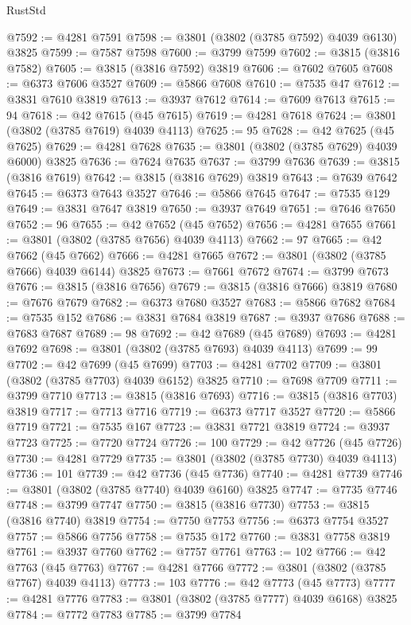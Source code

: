 \begin{lexlean}{RustStd}
\begin{coremodule}
@7592 := @4281 @7591
@7598 := @3801 (@3802 (@3785 @7592) @4039 @6130) @3825
@7599 := @7587 @7598
@7600 := @3799 @7599
@7602 := @3815 (@3816 @7582)
@7605 := @3815 (@3816 @7592) @3819
@7606 := @7602 @7605
@7608 := @6373 @7606 @3527
@7609 := @5866 @7608
@7610 := @7535 @47
@7612 := @3831 @7610 @3819
@7613 := @3937 @7612
@7614 := @7609 @7613
@7615 := 94
@7618 := @42 @7615 (@45 @7615)
@7619 := @4281 @7618
@7624 := @3801 (@3802 (@3785 @7619) @4039 @4113)
@7625 := 95
@7628 := @42 @7625 (@45 @7625)
@7629 := @4281 @7628
@7635 := @3801 (@3802 (@3785 @7629) @4039 @6000) @3825
@7636 := @7624 @7635
@7637 := @3799 @7636
@7639 := @3815 (@3816 @7619)
@7642 := @3815 (@3816 @7629) @3819
@7643 := @7639 @7642
@7645 := @6373 @7643 @3527
@7646 := @5866 @7645
@7647 := @7535 @129
@7649 := @3831 @7647 @3819
@7650 := @3937 @7649
@7651 := @7646 @7650
@7652 := 96
@7655 := @42 @7652 (@45 @7652)
@7656 := @4281 @7655
@7661 := @3801 (@3802 (@3785 @7656) @4039 @4113)
@7662 := 97
@7665 := @42 @7662 (@45 @7662)
@7666 := @4281 @7665
@7672 := @3801 (@3802 (@3785 @7666) @4039 @6144) @3825
@7673 := @7661 @7672
@7674 := @3799 @7673
@7676 := @3815 (@3816 @7656)
@7679 := @3815 (@3816 @7666) @3819
@7680 := @7676 @7679
@7682 := @6373 @7680 @3527
@7683 := @5866 @7682
@7684 := @7535 @152
@7686 := @3831 @7684 @3819
@7687 := @3937 @7686
@7688 := @7683 @7687
@7689 := 98
@7692 := @42 @7689 (@45 @7689)
@7693 := @4281 @7692
@7698 := @3801 (@3802 (@3785 @7693) @4039 @4113)
@7699 := 99
@7702 := @42 @7699 (@45 @7699)
@7703 := @4281 @7702
@7709 := @3801 (@3802 (@3785 @7703) @4039 @6152) @3825
@7710 := @7698 @7709
@7711 := @3799 @7710
@7713 := @3815 (@3816 @7693)
@7716 := @3815 (@3816 @7703) @3819
@7717 := @7713 @7716
@7719 := @6373 @7717 @3527
@7720 := @5866 @7719
@7721 := @7535 @167
@7723 := @3831 @7721 @3819
@7724 := @3937 @7723
@7725 := @7720 @7724
@7726 := 100
@7729 := @42 @7726 (@45 @7726)
@7730 := @4281 @7729
@7735 := @3801 (@3802 (@3785 @7730) @4039 @4113)
@7736 := 101
@7739 := @42 @7736 (@45 @7736)
@7740 := @4281 @7739
@7746 := @3801 (@3802 (@3785 @7740) @4039 @6160) @3825
@7747 := @7735 @7746
@7748 := @3799 @7747
@7750 := @3815 (@3816 @7730)
@7753 := @3815 (@3816 @7740) @3819
@7754 := @7750 @7753
@7756 := @6373 @7754 @3527
@7757 := @5866 @7756
@7758 := @7535 @172
@7760 := @3831 @7758 @3819
@7761 := @3937 @7760
@7762 := @7757 @7761
@7763 := 102
@7766 := @42 @7763 (@45 @7763)
@7767 := @4281 @7766
@7772 := @3801 (@3802 (@3785 @7767) @4039 @4113)
@7773 := 103
@7776 := @42 @7773 (@45 @7773)
@7777 := @4281 @7776
@7783 := @3801 (@3802 (@3785 @7777) @4039 @6168) @3825
@7784 := @7772 @7783
@7785 := @3799 @7784

\end{coremodule}
\end{lexlean}
